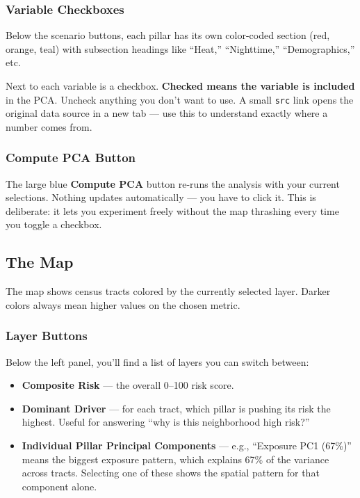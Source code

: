 \documentclass[11pt]{article}
\begin{document}
\subsubsection*{Variable Checkboxes}
Below the scenario buttons, each pillar has its own color-coded section
(\textcolor{exposure}{red}, \textcolor{sensitivity}{orange},
\textcolor{adaptive}{teal}) with subsection headings like ``Heat,''
``Nighttime,'' ``Demographics,'' etc.

Next to each variable is a checkbox. \textbf{Checked means the variable is
included} in the PCA. Uncheck anything you don't want to use. A small
\texttt{src} link opens the original data source in a new tab --- use
this to understand exactly where a number comes from.

\subsubsection*{Compute PCA Button}
The large blue \textbf{Compute PCA} button re-runs the analysis with
your current selections. Nothing updates automatically --- you have to
click it. This is deliberate: it lets you experiment freely without the
map thrashing every time you toggle a checkbox.

\subsection{The Map}

The map shows census tracts colored by the currently selected layer.
Darker colors always mean higher values on the chosen metric.

\subsubsection*{Layer Buttons}
Below the left panel, you'll find a list of layers you can switch between:
\begin{itemize}[leftmargin=*]
  \item \textbf{Composite Risk} --- the overall 0--100 risk score.
  \item \textbf{Dominant Driver} --- for each tract, which pillar is
        pushing its risk the highest. Useful for answering ``why is this
        neighborhood high risk?''
  \item \textbf{Individual Pillar Principal Components} --- e.g.,
        ``Exposure PC1 (67\%)'' means the biggest exposure pattern, which
        explains 67\% of the variance across tracts. Selecting one of
        these shows the spatial pattern for that component alone.
\end{itemize}
\end{document}
